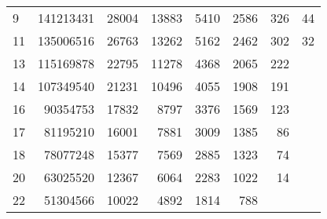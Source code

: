 \begin{table}[hbp]
\begin{tabular}{lrrrrrrr}
9                                                        & 141213431                                               & 28004                  & 13883                   & 5410                    & 2586                    & 326                      & 44                       \\
11                                                       & 135006516                                               & 26763                  & 13262                   & 5162                    & 2462                    & 302                      & 32                       \\
13                                                       & 115169878                                               & 22795                  & 11278                   & 4368                    & 2065                    & 222                      &                          \\
14                                                       & 107349540                                               & 21231                  & 10496                   & 4055                    & 1908                    & 191                      &                          \\
16                                                       & 90354753                                                & 17832                  & 8797                    & 3376                    & 1569                    & 123                      &                          \\
17                                                       & 81195210                                                & 16001                  & 7881                    & 3009                    & 1385                    & 86                       &                          \\
18                                                       & 78077248                                                & 15377                  & 7569                    & 2885                    & 1323                    & 74                       &                          \\
20                                                       & 63025520                                                & 12367                  & 6064                    & 2283                    & 1022                    & 14                       &                          \\
22                                                       & 51304566                                                & 10022                  & 4892                    & 1814                    & 788                     &                          &                          \\

\end{tabular}
\end{table}
